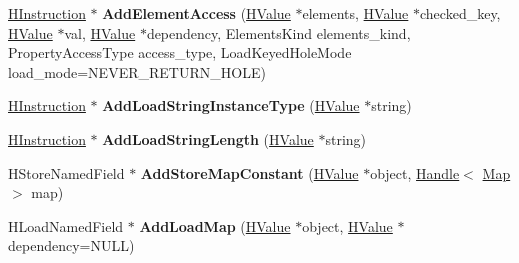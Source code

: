 \begin{DoxyCompactItemize}
\item 
\hypertarget{classv8_1_1internal_1_1_h_graph_builder_a8cdd69d96f435dc5ee72d4fecfe89a48}{}\hyperlink{classv8_1_1internal_1_1_h_instruction}{H\+Instruction} $\ast$ {\bfseries Add\+Element\+Access} (\hyperlink{classv8_1_1internal_1_1_h_value}{H\+Value} $\ast$elements, \hyperlink{classv8_1_1internal_1_1_h_value}{H\+Value} $\ast$checked\+\_\+key, \hyperlink{classv8_1_1internal_1_1_h_value}{H\+Value} $\ast$val, \hyperlink{classv8_1_1internal_1_1_h_value}{H\+Value} $\ast$dependency, Elements\+Kind elements\+\_\+kind, Property\+Access\+Type access\+\_\+type, Load\+Keyed\+Hole\+Mode load\+\_\+mode=N\+E\+V\+E\+R\+\_\+\+R\+E\+T\+U\+R\+N\+\_\+\+H\+O\+L\+E)\label{classv8_1_1internal_1_1_h_graph_builder_a8cdd69d96f435dc5ee72d4fecfe89a48}

\item 
\hypertarget{classv8_1_1internal_1_1_h_graph_builder_a81cbe5546c74a422efc24b88265ceb95}{}\hyperlink{classv8_1_1internal_1_1_h_instruction}{H\+Instruction} $\ast$ {\bfseries Add\+Load\+String\+Instance\+Type} (\hyperlink{classv8_1_1internal_1_1_h_value}{H\+Value} $\ast$string)\label{classv8_1_1internal_1_1_h_graph_builder_a81cbe5546c74a422efc24b88265ceb95}

\item 
\hypertarget{classv8_1_1internal_1_1_h_graph_builder_aeb778c809c8ca81cd1fe98fc886145a2}{}\hyperlink{classv8_1_1internal_1_1_h_instruction}{H\+Instruction} $\ast$ {\bfseries Add\+Load\+String\+Length} (\hyperlink{classv8_1_1internal_1_1_h_value}{H\+Value} $\ast$string)\label{classv8_1_1internal_1_1_h_graph_builder_aeb778c809c8ca81cd1fe98fc886145a2}

\item 
\hypertarget{classv8_1_1internal_1_1_h_graph_builder_a2be176baccb6ad1afd834f28d8e6d3b1}{}H\+Store\+Named\+Field $\ast$ {\bfseries Add\+Store\+Map\+Constant} (\hyperlink{classv8_1_1internal_1_1_h_value}{H\+Value} $\ast$object, \hyperlink{classv8_1_1internal_1_1_handle}{Handle}$<$ \hyperlink{classv8_1_1internal_1_1_map}{Map} $>$ map)\label{classv8_1_1internal_1_1_h_graph_builder_a2be176baccb6ad1afd834f28d8e6d3b1}

\item 
\hypertarget{classv8_1_1internal_1_1_h_graph_builder_a8e09bec89c5877176bc979dc48f21dd5}{}H\+Load\+Named\+Field $\ast$ {\bfseries Add\+Load\+Map} (\hyperlink{classv8_1_1internal_1_1_h_value}{H\+Value} $\ast$object, \hyperlink{classv8_1_1internal_1_1_h_value}{H\+Value} $\ast$dependency=N\+U\+L\+L)\label{classv8_1_1internal_1_1_h_graph_builder_a8e09bec89c5877176bc979dc48f21dd5}


\end{DoxyCompactItemize}
